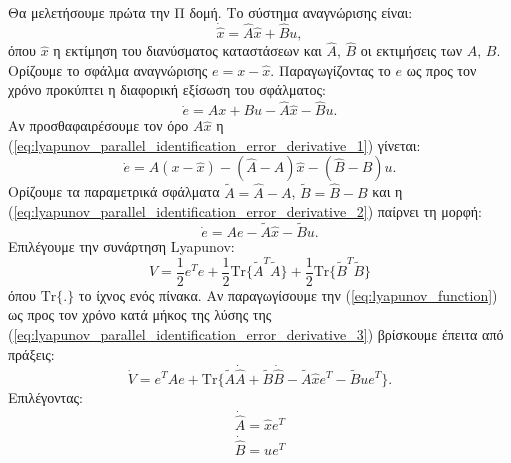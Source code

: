 \documentclass[a4paper,12pt]{article}
\begin{document}
Θα μελετήσουμε πρώτα την Π δομή. Το σύστημα αναγνώρισης είναι:
\begin{equation}
    \dot{\hat{x}} = \hat{A}\hat{x} + \hat{B} u,
    \label{eq:lyapunov_parallel_identification_system}
\end{equation}
όπου $\hat{x}$ η εκτίμηση του διανύσματος καταστάσεων και $\hat{A}, \, \hat{B}$ οι εκτιμήσεις των $A, \, B$.
Ορίζουμε το σφάλμα αναγνώρισης $e = x - \hat{x}$. Παραγωγίζοντας το $e$ ως προς τον χρόνο προκύπτει η διαφορική
εξίσωση του σφάλματος:
\begin{equation}
    \dot{e} = Ax + Bu - \hat{A}\hat{x} - \hat{B}u.
    \label{eq:lyapunov_parallel_identification_error_derivative_1}
\end{equation}
Αν προσθαφαιρέσουμε τον όρο $A\hat{x}$ η (\ref{eq:lyapunov_parallel_identification_error_derivative_1}) γίνεται:
\begin{equation}
    \dot{e} = A(x - \hat{x}) - (\hat{A} - A)\hat{x} - (\hat{B} - B)u.
    \label{eq:lyapunov_parallel_identification_error_derivative_2}
\end{equation}
Ορίζουμε τα παραμετρικά σφάλματα $\tilde{A} = \hat{A} - A$, $\tilde{B} = \hat{B} - B$ και η 
(\ref{eq:lyapunov_parallel_identification_error_derivative_2}) παίρνει τη μορφή:
\begin{equation}
    \dot{e} = Ae -\tilde{A}\hat{x} - \tilde{B}u.
    \label{eq:lyapunov_parallel_identification_error_derivative_3}
\end{equation}
Επιλέγουμε την συνάρτηση Lyapunov:
\begin{equation}
    V = \frac{1}{2}e^Te + \frac{1}{2}\mathrm{Tr}\{\tilde{A}^T\tilde{A}\} + 
    \frac{1}{2}\mathrm{Tr}\{\tilde{B}^T\tilde{B}\}
    \label{eq:lyapunov_function}
\end{equation}
όπου $\mathrm{Tr\{.\}}$ το ίχνος ενός πίνακα. Αν παραγωγίσουμε την (\ref{eq:lyapunov_function}) ως προς τον
χρόνο κατά μήκος της λύσης της (\ref{eq:lyapunov_parallel_identification_error_derivative_3}) βρίσκουμε έπειτα
από πράξεις:
\begin{equation}
    \dot{V} = e^TAe + \mathrm{Tr}\{\tilde{A}\dot{\hat{A}} + \tilde{B}\dot{\hat{B}} - 
    \tilde{A}\hat{x}e^T - \tilde{B}ue^T\}.
    \label{eq:lyapunov_parallel_function_derivative_1}
\end{equation}
Επιλέγοντας:
\begin{equation}
    \begin{aligned}
        \dot{\hat{A}} = \hat{x}e^T \\ 
        \dot{\hat{B}} = ue^T
    \end{aligned}
    \label{eq:lyapunov_parallel_update_formula}
\end{equation}
\end{document}
